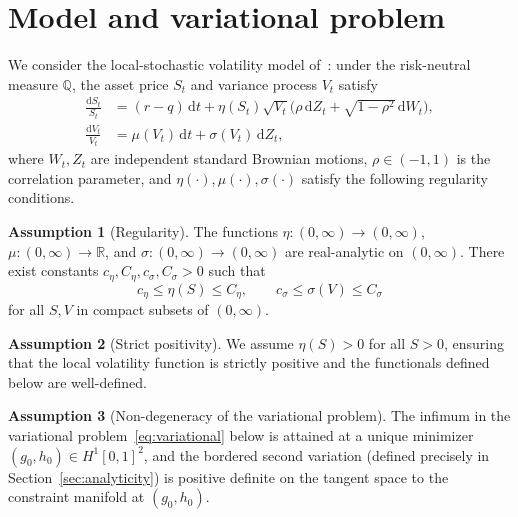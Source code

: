\documentclass[11pt]{article}
\theoremstyle{definition}
\newtheorem{assumption}{Assumption}
\newcommand{\dd}{\mathrm{d}}
\newcommand{\R}{\mathbb{R}}
\newcommand{\Q}{\mathbb{Q}}
\newcommand{\Hone}{H^1}
\begin{document}
\section{Model and variational problem}\label{sec:model}

We consider the local-stochastic volatility model of~\cite{PWZ2025}: under the risk-neutral measure $\Q$, the asset price $S_t$ and variance process $V_t$ satisfy
\begin{align}
  \frac{\dd S_t}{S_t} &= (r-q)\,\dd t + \eta(S_t)\sqrt{V_t}\bigl(\rho\,\dd Z_t + \sqrt{1-\rho^2}\,\dd W_t\bigr), \label{eq:model_S}\\
  \frac{\dd V_t}{V_t} &= \mu(V_t)\,\dd t + \sigma(V_t)\,\dd Z_t, \label{eq:model_V}
\end{align}
where $W_t, Z_t$ are independent standard Brownian motions, $\rho \in (-1,1)$ is the correlation parameter, and $\eta(\cdot), \mu(\cdot), \sigma(\cdot)$ satisfy the following regularity conditions.

\begin{assumption}[Regularity]\label{asm:regularity}
The functions $\eta: (0,\infty) \to (0,\infty)$, $\mu: (0,\infty) \to \R$, and $\sigma: (0,\infty) \to (0,\infty)$ are real-analytic on $(0,\infty)$. There exist constants $c_\eta, C_\eta, c_\sigma, C_\sigma > 0$ such that
\begin{equation}
  c_\eta \leq \eta(S) \leq C_\eta, \qquad c_\sigma \leq \sigma(V) \leq C_\sigma
\end{equation}
for all $S, V$ in compact subsets of $(0,\infty)$.
\end{assumption}

\begin{assumption}[Strict positivity]\label{asm:eta_positive}
We assume $\eta(S) > 0$ for all $S > 0$, ensuring that the local volatility function is strictly positive and the functionals defined below are well-defined.
\end{assumption}

\begin{assumption}[Non-degeneracy of the variational problem]\label{asm:nondegen}
The infimum in the variational problem~\eqref{eq:variational} below is attained at a unique minimizer $(g_0, h_0) \in \Hone[0,1]^2$, and the bordered second variation (defined precisely in Section~\ref{sec:analyticity}) is positive definite on the tangent space to the constraint manifold at $(g_0, h_0)$.
\end{assumption}
\end{document}
